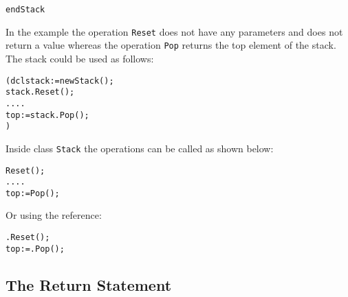 \documentclass[\pformat,12pt]{article}
\begin{document}
\begin{description}
\begin{alltt}
  end Stack
  \end{alltt}

  In the example the operation {\tt Reset} does not have any parameters
  and does not return a value whereas the operation {\tt Pop} returns
  the top element of the stack. The stack could be used as follows:
  \begin{alltt}
    ( dcl stack := new Stack();
      stack.Reset();
      ....
      top := stack.Pop();
    )
  \end{alltt}
 
  Inside class {\tt Stack} the operations can be called as shown below:   
  \begin{alltt}
    Reset();
    ....
    top := Pop();
  \end{alltt}
  
  Or using the  reference:
  \begin{alltt}
    .Reset();
    top := .Pop();
  \end{alltt}

\end{description}

\subsection{The Return Statement}
\end{document}
